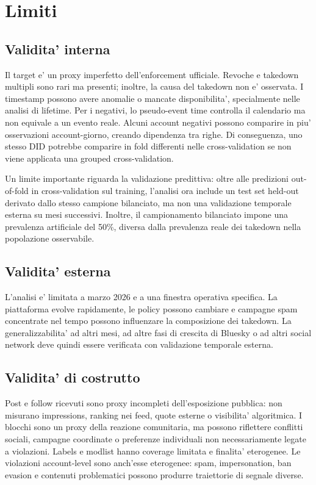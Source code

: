 \section{Limiti}

\subsection{Validita' interna}

Il target  e' un proxy imperfetto dell'enforcement ufficiale. Revoche e takedown multipli sono rari ma presenti; inoltre, la causa del takedown non e' osservata. I timestamp  possono avere anomalie o mancate disponibilita', specialmente nelle analisi di lifetime. Per i negativi, lo pseudo-event time controlla il calendario ma non equivale a un evento reale. Alcuni account negativi possono comparire in piu' osservazioni account-giorno, creando dipendenza tra righe. Di conseguenza, uno stesso DID potrebbe comparire in fold differenti nelle cross-validation se non viene applicata una grouped cross-validation.

Un limite importante riguarda la validazione predittiva: oltre alle predizioni out-of-fold in cross-validation sul training, l'analisi ora include un test set held-out derivato dallo stesso campione bilanciato, ma non una validazione temporale esterna su mesi successivi. Inoltre, il campionamento bilanciato impone una prevalenza artificiale del 50\%, diversa dalla prevalenza reale dei takedown nella popolazione osservabile.

\subsection{Validita' esterna}

L'analisi e' limitata a marzo 2026 e a una finestra operativa specifica. La piattaforma evolve rapidamente, le policy possono cambiare e campagne spam concentrate nel tempo possono influenzare la composizione dei takedown. La generalizzabilita' ad altri mesi, ad altre fasi di crescita di Bluesky o ad altri social network deve quindi essere verificata con validazione temporale esterna.

\subsection{Validita' di costrutto}

Post e follow ricevuti sono proxy incompleti dell'esposizione pubblica: non misurano impressions, ranking nei feed, quote esterne o visibilita' algoritmica. I blocchi sono un proxy della reazione comunitaria, ma possono riflettere conflitti sociali, campagne coordinate o preferenze individuali non necessariamente legate a violazioni. Labels e modlist hanno coverage limitata e finalita' eterogenee. Le violazioni account-level sono anch'esse eterogenee: spam, impersonation, ban evasion e contenuti problematici possono produrre traiettorie di segnale diverse.

